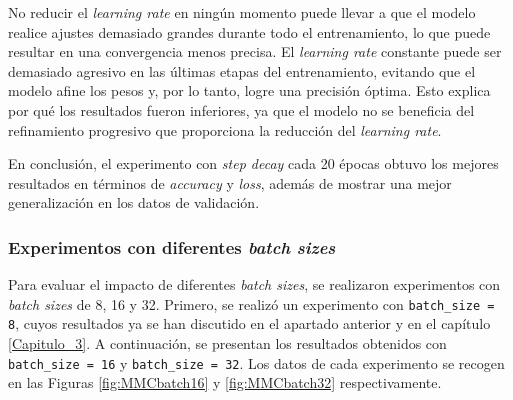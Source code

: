 No reducir el \textit{learning rate} en ningún momento puede llevar a que el modelo realice ajustes demasiado grandes durante todo el entrenamiento, lo que puede resultar en una convergencia menos precisa. El \textit{learning rate} constante puede ser demasiado agresivo en las últimas etapas del entrenamiento, evitando que el modelo afine los pesos y, por lo tanto, logre una precisión óptima. Esto explica por qué los resultados fueron inferiores, ya que el modelo no se beneficia del refinamiento progresivo que proporciona la reducción del \textit{learning rate}.

En conclusión, el experimento con \textit{step decay} cada 20 épocas obtuvo los mejores resultados en términos de \textit{accuracy} y \textit{loss}, además de mostrar una mejor generalización en los datos de validación.

\subsubsection{Experimentos con diferentes\textit{ batch sizes}} 

Para evaluar el impacto de diferentes \textit{batch sizes}, se realizaron experimentos con \textit{batch sizes} de 8, 16 y 32. Primero, se realizó un experimento con \lstinline|batch_size = 8|, cuyos resultados ya se han discutido en el apartado anterior y en el capítulo \ref{Capitulo_3}. A continuación, se presentan los resultados obtenidos con \lstinline|batch_size = 16| y \lstinline|batch_size = 32|. Los datos de cada experimento se recogen en las Figuras \ref{fig:MMCbatch16} y \ref{fig:MMCbatch32} respectivamente. 

